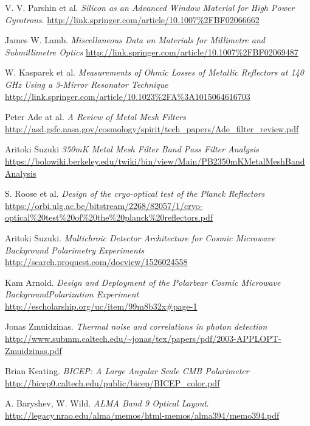 \documentclass[12pt, titlepage]{article} %
\begin{document}
\begin{thebibliography}{9}

V. V. Parshin et al.
\emph{Silicon as an Advanced Window Material for High Power Gyrotrons}.
\url{http://link.springer.com/article/10.1007\%2FBF02066662}

James W. Lamb.
\emph{Miscellaneous Data on Materials for Millimetre and Submillimetre Optics}
\url{http://link.springer.com/article/10.1007\%2FBF02069487}

W. Kasparek et al.
\emph{Measurements of Ohmic Losses of Metallic Reflectors at 140 GHz Using a 3-Mirror Resonator Technique}
\url{http://link.springer.com/article/10.1023\%2FA\%3A1015064616703}

Peter Ade at al.
\emph{A Review of Metal Mesh Filters}
\url{http://asd.gsfc.nasa.gov/cosmology/spirit/tech\_papers/Ade\_filter\_review.pdf}

Aritoki Suzuki
\emph{350mK Metal Mesh Filter Band Pass Filter Analysis}
\url{https://bolowiki.berkeley.edu/twiki/bin/view/Main/PB2350mKMetalMeshBandAnalysis}

S. Roose et al.
\emph{Design of the cryo-optical test of the Planck Reflectors}
\url{https://orbi.ulg.ac.be/bitstream/2268/82057/1/cryo-optical\%20test\%20of\%20the\%20planck\%20reflectors.pdf}

Aritoki Suzuki.
\emph{Multichroic Detector Architecture for Cosmic Microwave Background Polarimetry Experiments}
\url{http://search.proquest.com/docview/1526024558}

Kam Arnold.
\emph{Design and Deployment of the Polarbear Cosmic Microwave BackgroundPolarization Experiment}
\url{http://escholarship.org/uc/item/99m8b32x\#page-1}

Jonas Zmuidzinas.
\emph{Thermal noise and correlations in photon detection}
\url{http://www.submm.caltech.edu/~jonas/tex/papers/pdf/2003-APPLOPT-Zmuidzinas.pdf}

Brian Keating.
\emph{BICEP: A Large Angular Scale CMB Polarimeter}
\url{http://bicep0.caltech.edu/public/bicep/BICEP\_color.pdf}

A. Baryshev, W. Wild.
\emph{ALMA Band 9 Optical Layout}.
\url{http://legacy.nrao.edu/alma/memos/html-memos/alma394/memo394.pdf}

\end{thebibliography}
\end{document}
